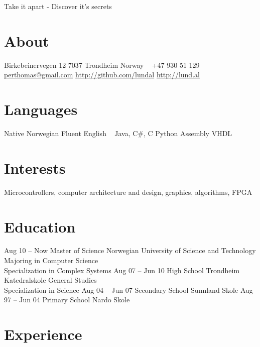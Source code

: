 \documentclass[print]{friggeri-cv}
\begin{document}
       {Take it apart - Discover it's secrets}


\begin{aside}
    \section{About}
        Birkebeinervegen 12
        7037 Trondheim
        Norway
        ~
        +47 930 51 129
        ~
        \href{mailto:perthomas@gmail.com}{perthomas@gmail.com}
        \href{http://github.com/lundal}{http://github.com/lundal}
        \href{http://lund.al}{http://lund.al}
    \section{Languages}
        Native Norwegian
        Fluent English
        ~
        Java, C\#, C
        Python
        Assembly
        VHDL
\end{aside}

\section{Interests}

Microcontrollers, computer architecture and design, graphics, algorithms, FPGA

\section{Education}

\begin{entrylist}
    \entry
        {Aug 10 – Now}
        {Master of Science}
        {Norwegian University of Science and Technology}
        {Majoring in Computer Science\\
        Specialization in Complex Systems}
    \entry
        {Aug 07 – Jun 10}
        {High School}
        {Trondheim Katedralskole}
        {General Studies\\
        Specialization in Science}
    \entry
        {Aug 04 – Jun 07}
        {Secondary School}
        {Sunnland Skole}
        {}
    \entry
        {Aug 97 – Jun 04}
        {Primary School}
        {Nardo Skole}
        {}
\end{entrylist}

\section{Experience}
\end{document}
